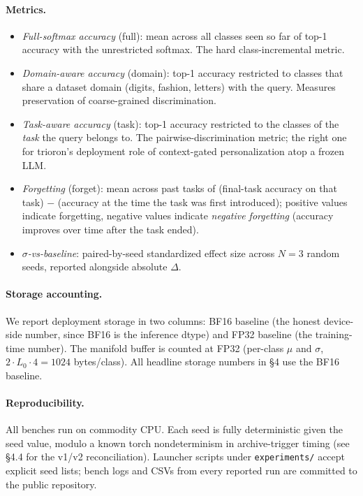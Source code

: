 \documentclass[11pt]{article}
\begin{document}
\paragraph{Metrics.}
\begin{itemize}[leftmargin=1.5em]
  \item \emph{Full-softmax accuracy} (full): mean across all classes seen
        so far of top-1 accuracy with the unrestricted softmax. The hard
        class-incremental metric.
  \item \emph{Domain-aware accuracy} (domain): top-1 accuracy restricted
        to classes that share a dataset domain (digits, fashion, letters)
        with the query. Measures preservation of coarse-grained
        discrimination.
  \item \emph{Task-aware accuracy} (task): top-1 accuracy restricted to
        the classes of the \emph{task} the query belongs to. The
        pairwise-discrimination metric; the right one for trioron's
        deployment role of context-gated personalization atop a frozen
        LLM.
  \item \emph{Forgetting} (forget): mean across past tasks of (final-task
        accuracy on that task) $-$ (accuracy at the time the task was
        first introduced); positive values indicate forgetting, negative
        values indicate \emph{negative forgetting} (accuracy improves over
        time after the task ended).
  \item \emph{$\sigma$-vs-baseline}: paired-by-seed standardized effect
        size across $N = 3$ random seeds, reported alongside absolute
        $\Delta$.
\end{itemize}

\paragraph{Storage accounting.}
We report deployment storage in two columns: BF16 baseline (the honest
device-side number, since BF16 is the inference dtype) and FP32 baseline
(the training-time number). The manifold buffer is counted at FP32
(per-class $\mu$ and $\sigma$, $2 \cdot L_0 \cdot 4 = 1024$ bytes/class).
All headline storage numbers in \S4 use the BF16 baseline.

\paragraph{Reproducibility.}
All benches run on commodity CPU. Each seed is fully deterministic given
the seed value, modulo a known torch nondeterminism in archive-trigger
timing (see \S4.4 for the v1/v2 reconciliation). Launcher scripts under
\texttt{experiments/} accept explicit seed lists; bench logs and CSVs from
every reported run are committed to the public repository.



\end{document}
